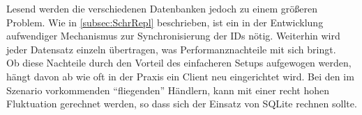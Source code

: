 \documentclass[12pt,a4paper,ngerman,english]{report}
\begin{document}
Lesend werden die verschiedenen Datenbanken jedoch zu einem größeren Problem. Wie in \autoref{subsec:SchrRepl} beschrieben, ist ein in der Entwicklung aufwendiger Mechanismus zur Synchronisierung der IDs nötig. Weiterhin wird jeder Datensatz einzeln übertragen, was Performanznachteile mit sich bringt.\\

Ob diese Nachteile durch den Vorteil des einfacheren Setups aufgewogen werden, hängt davon ab wie oft in der Praxis ein Client neu eingerichtet wird. Bei den im Szenario vorkommenden ``fliegenden'' Händlern, kann mit einer recht hohen Fluktuation gerechnet werden, so dass sich der Einsatz von SQLite rechnen sollte.

{}

\end{document}
